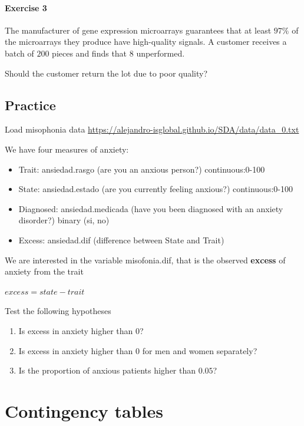 \documentclass[
]{book}
\providecommand{\tightlist}{%
  \setlength{\itemsep}{0pt}\setlength{\parskip}{0pt}}
\begin{document}
\hypertarget{exercise-3-8}{%
\subsubsection{Exercise 3}\label{exercise-3-8}}

The manufacturer of gene expression microarrays guarantees that at least \(97\%\) of the microarrays they produce have high-quality signals. A customer receives a batch of \(200\) pieces and finds that \(8\) unperformed.

Should the customer return the lot due to poor quality?

\hypertarget{practice-4}{%
\section{Practice}\label{practice-4}}

Load misophonia data \url{https://alejandro-isglobal.github.io/SDA/data/data_0.txt}

We have four measures of anxiety:

\begin{itemize}
\tightlist
\item
  Trait: ansiedad.rasgo (are you an anxious person?) continuous:0-100
\item
  State: ansiedad.estado (are you currently feeling anxious?) continuous:0-100
\item
  Diagnosed: ansiedad.medicada (have you been diagnosed with an anxiety disorder?) binary (si, no)
\item
  Excess: ansiedad.dif (difference between State and Trait)
\end{itemize}

We are interested in the variable misofonia.dif, that is the observed \textbf{excess} of anxiety from the trait

\(excess = state - trait\)

Test the following hypotheses

\begin{enumerate}
\def\labelenumi{\alph{enumi}.}
\item
  Is excess in anxiety higher than \(0\)?
\item
  Is excess in anxiety higher than \(0\) for men and women separately?
\item
  Is the proportion of anxious patients higher than \(0.05\)?
\end{enumerate}

\hypertarget{contingency-tables}{%
\chapter{Contingency tables}\label{contingency-tables}}
\end{document}
